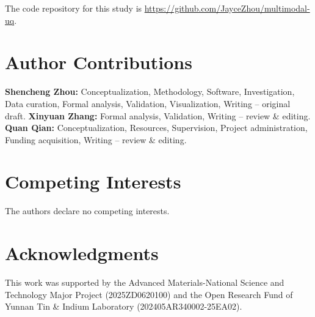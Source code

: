 \documentclass[lettersize,journal]{IEEEtran}
\begin{document}
The code repository for this study is \url{https://github.com/JayceZhou/multimodal-uq}.

\section*{Author Contributions}

{\small \textbf{Shencheng Zhou:} Conceptualization, Methodology, Software, Investigation, Data curation, Formal analysis, Validation, Visualization, Writing -- original draft. \textbf{Xinyuan Zhang:} Formal analysis, Validation, Writing -- review \& editing. \textbf{Quan Qian:} Conceptualization, Resources, Supervision, Project administration, Funding acquisition, Writing -- review \& editing.\par}

\section*{Competing Interests}

The authors declare no competing interests.

\section*{Acknowledgments}

This work was supported by the Advanced Materials-National Science and Technology Major Project (2025ZD0620100) and the Open Research Fund of Yunnan Tin \& Indium Laboratory (202405AR340002-25EA02).
\end{document}
